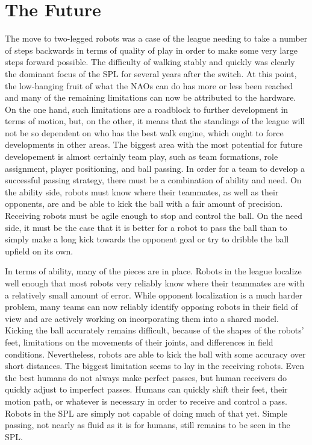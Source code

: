 \documentclass{llncs}
\begin{document}
\section{The Future}

The move to two-legged robots was a case of the league needing to take a number
of steps backwards in terms of quality of play in order to make some very large
steps forward possible. The difficulty of walking stably and quickly was clearly the dominant
focus of the SPL for several years after the switch. At this point, the
low-hanging fruit of what the NAOs can do has more or less been reached and many of the
remaining limitations can now be attributed to the hardware. On the one hand, such limitations
are a roadblock to further development in terms of motion, but, on the other,
it means that the standings of the league will not be so dependent on who
has the best walk engine, which ought to force developments in other areas.
The biggest area with the most potential for future developement is almost certainly team play,
such as team formations, role assignment, player positioning, and ball passing. In order for a team to develop a successful passing strategy,
there must be a combination of ability and need. On the ability side, robots must
know where their teammates, as well as their opponents, are and be able to kick the ball with a fair amount
of precision. Receiving robots must be agile enough to stop and control the
ball. On the need side, it must be the case that it is better for a robot to pass
the ball than to simply make a long kick towards the opponent goal or try to dribble the ball
upfield on its own.

In terms of ability, many of the pieces are in place. Robots in the league localize
well enough that most robots very reliably know where their teammates are
with a relatively small amount of error. While opponent localization is a much
harder problem, many teams can now reliably identify opposing robots in their field
of view and are actively working on incorporating them into a shared model.
Kicking the ball accurately remains difficult,
because of the shapes of the robots' feet, limitations on the movements of their joints, and differences in field conditions. Nevertheless, robots are able to kick
the ball with some accuracy over short distances. The biggest limitation seems to
lay in the receiving robots. Even the best humans do not always make perfect passes,
but human receivers do quickly adjust to imperfect passes. Humans can quickly
shift their feet, their motion path, or whatever is necessary in order to receive and
control a pass. Robots in the SPL are simply not capable of doing much
of that yet. Simple passing, not  nearly as fluid as it
is for humans, still remains to be seen in the SPL.
\end{document}
